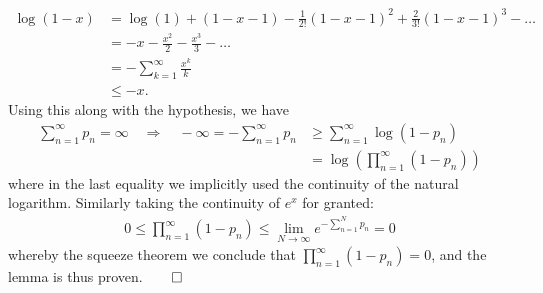 \documentclass[10pt]{article}
\newcommand{\bp}[1]{\left({#1}\right)}
\newcommand{\1}[1]{\mathbbm{1}_{#1}}
\begin{document}
    \begin{align*}
        \log(1-x)&=\log(1)+(1-x-1)-\frac{1}{2!}(1-x-1)^2+\frac{2}{3!}(1-x-1)^3-\dots\\
        &=-x-\frac{x^2}{2}-\frac{x^3}{3}-\dots\\
        &=-\sum_{k=1}^\infty\frac{x^k}{k}\\
        &\leq -x.\tag{1}
    \end{align*}
    Using this along with the hypothesis, we have
    \begin{align*}
        \sum_{n=1}^\infty p_n=\infty\quad\Rightarrow\quad -\infty=-\sum_{n=1}^\infty p_n&\geq \sum_{n=1}^\infty\log(1-p_n)\tag{by (1)}\\
        &=\log\bp{\prod_{n=1}^\infty(1-p_n)}
    \end{align*}
    where in the last equality we implicitly used the continuity of the natural logarithm. Similarly taking the continuity of $e^x$ for granted:
    \begin{align*}
        0\leq \prod_{n=1}^\infty(1-p_n)\leq \lim_{N\rightarrow\infty}e^{-\sum_{n=1}^Np_n}=0
    \end{align*}
    whereby the squeeze theorem we conclude that $\prod_{n=1}^\infty(1-p_n)=0$, and the lemma is thus proven.\hfill{$\qed$}\\[5pt]
\end{document}
